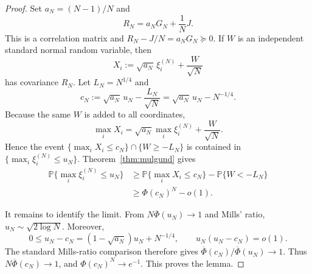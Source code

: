 \documentclass[11pt]{article}
\newcommand{\PP}{\mathbb P}
\newcommand{\phibar}{\overline\Phi}
\begin{document}
\begin{proof}
Set $a_N=(N-1)/N$ and
\[
 R_N=a_NG_N+\frac1N J.
\]
This is a correlation matrix and $R_N-J/N=a_NG_N\succeq0$.  If $W$ is an
independent standard normal random variable, then
\[
 X_i:=\sqrt{a_N}\,\xi_i^{(N)}+\frac{W}{\sqrt N}
\]
has covariance $R_N$.  Let $L_N=N^{1/4}$ and
\[
 c_N:=\sqrt{a_N}\,u_N-\frac{L_N}{\sqrt N}
      =\sqrt{a_N}\,u_N-N^{-1/4}.
\]
Because the same $W$ is added to all coordinates,
\[
 \max_iX_i=\sqrt{a_N}\max_i\xi_i^{(N)}+\frac{W}{\sqrt N}.
\]
Hence the event $\{\max_iX_i\le c_N\}\cap\{W\ge-L_N\}$ is contained in
$\{\max_i\xi_i^{(N)}\le u_N\}$.  Theorem~\ref{thm:mulgund} gives
\begin{align*}
 \PP\{\max_i\xi_i^{(N)}\le u_N\}
 &\ge \PP\{\max_iX_i\le c_N\}-\PP\{W<-L_N\}\\
 &\ge \Phi(c_N)^N-o(1).
\end{align*}

It remains to identify the limit.  From $N\phibar(u_N)\to1$ and Mills'
ratio, $u_N\sim\sqrt{2\log N}$.  Moreover,
\[
 0\le u_N-c_N=(1-\sqrt{a_N})u_N+N^{-1/4},
 \qquad
 u_N(u_N-c_N)=o(1).
\]
The standard Mills-ratio comparison therefore gives
$\phibar(c_N)/\phibar(u_N)\to1$.  Thus
$N\phibar(c_N)\to1$, and
$\Phi(c_N)^N\to e^{-1}$.  This proves the lemma.
\end{proof}
\end{document}
